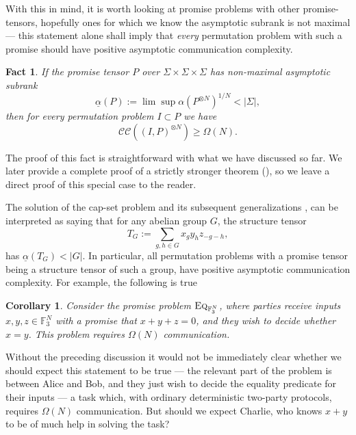 \documentclass[10pt,a4paper]{article}
\newtheorem{fact}[theorem]{Fact}
\newtheorem{corollary}[theorem]{Corollary}
\newcommand{\F}{\mathbb{F}}
\newcommand{\cc}{\mathcal{CC}}
\newcommand{\eq}{\textsc{Eq}}
\begin{document}
With this in mind, it is worth looking at promise problems with other promise-tensors, hopefully ones for which we know the asymptotic subrank is not maximal --- this statement alone shall imply that \emph{every} permutation problem with such a promise should have positive asymptotic communication complexity.

\begin{fact}
\label{fct:group-promise-hard}
    If the promise tensor $P$ over $\Sigma \times \Sigma \times \Sigma$ has non-maximal asymptotic subrank
    \begin{equation*}
        \underline{\alpha}(P) := \lim \sup \alpha(P^{\otimes N})^{1/N} < |\Sigma|,
    \end{equation*}
    then for every permutation problem $I \subset P$ we have 
    \begin{equation*}
        \cc((I, P)^{\otimes N}) \geq \Omega(N).
    \end{equation*}
\end{fact}
The proof of this fact is straightforward with what we have discussed so far. We later provide a complete proof of a strictly stronger theorem (), so we leave a direct proof of this special case to the reader. 

The solution of the cap-set problem \cite{CLP17,ED17,T16} and its subsequent generalizations \cite{BCHGNSU17}, can be interpreted as saying that for any abelian group $G$, the structure tensor
\begin{equation*}
    T_G := \sum_{g,h \in G} x_{g} y_{h} z_{-g-h},
\end{equation*}
has $\underline{\alpha}(T_G) < |G|$. In particular, all permutation problems with a promise tensor being a structure tensor of such a group, have positive asymptotic communication complexity. For example, the following is true
\begin{corollary}
    Consider the promise problem $\eq_{\F_3^N}$, where parties receive inputs $x,y,z \in \F_3^N$ with a promise that $x+y+z = 0$, and they wish to decide whether $x=y$. This problem requires $\Omega(N)$ communication.
\end{corollary}

Without the preceding discussion it would not be immediately clear whether we should expect this statement to be true --- the relevant part of the problem is between Alice and Bob, and they just wish to decide the equality predicate for their inputs --- a task which, with ordinary deterministic two-party protocols, requires $\Omega(N)$ communication. But should we expect Charlie, who knows $x+y$ to be of much help in solving the task?
\end{document}
